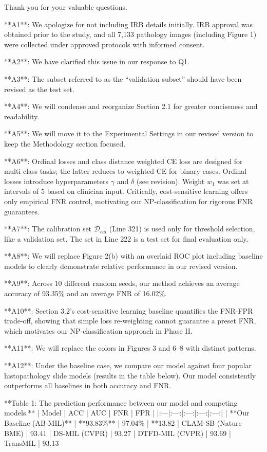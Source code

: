 Thank you for your valuable questions.

**A1**: We apologize for not including IRB details initially. IRB approval was obtained prior to the study, and all 7,133 pathology images (including Figure 1) were collected under approved protocols with informed consent. 

**A2**: We have clarified this issue in our response to Q1.

**A3**: The subset referred to as the ``validation subset'' should have been revised as the test set.

**A4**: We will condense and reorganize Section 2.1 for greater conciseness and readability.

**A5**: We will move it to the Experimental Settings in our revised version to keep the Methodology section focused.

**A6**: Ordinal losses and class distance weighted CE loss are designed for multi-class tasks; the latter reduces to weighted CE for binary cases. Ordinal losses introduce hyperparameters $\gamma$ and $\delta$ (see revision). Weight $w_1$ was set at intervals of 5 based on clinician input. Critically, cost-sensitive learning offers only empirical FNR control, motivating our NP-classification for rigorous FNR guarantees.

**A7**: The calibration set $\mathcal{D}_{cal}$ (Line 321) is used only for threshold selection, like a validation set. The set in Line 222 is a test set for final evaluation only. 

**A8**: We will replace Figure 2(b) with an overlaid ROC plot including baseline models to clearly demonstrate relative performance in our revised version.

**A9**: Across 10 different random seeds, our method achieves an average accuracy of 93.35\% and an average FNR of 16.02\%.

**A10**: Section 3.2's cost-sensitive learning baseline quantifies the FNR-FPR trade-off, showing that simple loss re-weighting cannot guarantee a preset FNR, which motivates our NP-classification approach in Phase II.

**A11**: We will replace the colors in Figures 3 and 6–8 with distinct patterns.

**A12**: Under the baseline case, we compare our model against four popular histopathology slide models (results in the table below). Our model consistently outperforms all baselines in both accuracy and FNR.

**Table 1: The prediction performance between our model and competing models.**
| Model | ACC | AUC | FNR | FPR |
|:---|:---:|:---:|:---:|:---:|
| **Our Baseline (AB-MIL)** | **93.83\%** | 97.04\% | **13.82%
| CLAM-SB (Nature BME) | 93.41%
| DS-MIL (CVPR) | 93.27%
| DTFD-MIL (CVPR) | 93.69%
| TransMIL | 93.13%